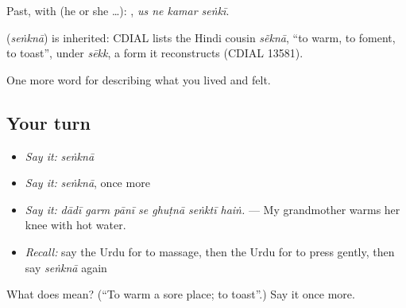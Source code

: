 Past, with  (he or she …):    , \emph{us ne kamar seṅkī}.

\begin{cousinweb}
\textbf{} (\emph{seṅknā}) is inherited: CDIAL lists the Hindi cousin \emph{sẽknā}, \textquotedblleft{}to warm, to foment, to toast\textquotedblright{}, under \emph{sēkk}, a form it reconstructs (CDIAL 13581).
\end{cousinweb}

\begin{grammarlens}[title={What you've built}]
One more word for describing what you lived and felt.
\end{grammarlens}

\subsection*{Your turn}
\begin{itemize}
\raggedright
  \item \emph{Say it:} \emph{seṅknā}
  \item \emph{Say it:} \emph{seṅknā}, once more
  \item \emph{Say it:} \emph{dādī garm pānī se ghuṭnā seṅktī haiṅ.} — My grandmother warms her knee with hot water.
  \item \emph{Recall:} say the Urdu for to massage, then the Urdu for to press gently, then say \emph{seṅknā} again
\end{itemize}

\begin{tcolorbox}[breakable,colback=teal!4,colframe=teal!35!black,title={Before you move on}]
What does  mean? (\textquotedblleft{}To warm a sore place; to toast\textquotedblright{}.) Say it once more.
\end{tcolorbox}
